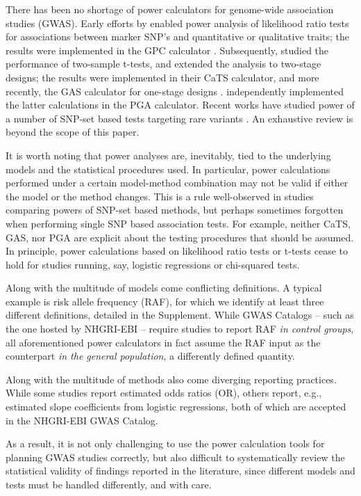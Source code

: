 There has been no shortage of power calculators for genome-wide association studies (GWAS).
Early efforts by \cite{Sham98} enabled power analysis of likelihood ratio tests for associations between marker SNP's and quantitative or qualitative traits; the results were implemented in the GPC calculator \citep{Purcell03}.
Subsequently, \cite{Skol06} studied the performance of two-sample t-tests, and extended the analysis to two-stage designs; the results were implemented in their CaTS calculator, and more recently, the GAS calculator for one-stage designs \citep{Johnson17}.
\citealp{Menashe08} independently implemented the latter calculations in the PGA calculator.
Recent works have studied power of a number of SNP-set based tests targeting rare variants \citep{Wang14, Derkach17}.
An exhaustive review is beyond the scope of this paper.

It is worth noting that power analyses are, inevitably, tied to the underlying models and the statistical procedures used.
In particular, power calculations performed under a certain model-method combination may not be valid if either the model or the method changes.
This is a rule well-observed in studies comparing powers of SNP-set based methods, but perhaps sometimes forgotten when performing single SNP based association tests.
For example, neither CaTS, GAS, nor PGA are explicit about the testing procedures that should be assumed.
In principle, power calculations based on likelihood ratio tests or t-tests cease to hold for studies running, say, logistic regressions or chi-squared tests.

Along with the multitude of models come conflicting definitions. 
A typical example is risk allele frequency (RAF), for which we identify at least three different definitions, detailed in the Supplement. 
While GWAS Catalogs -- such as the one hosted by NHGRI-EBI \citep{MacArthur16} -- require studies to report RAF \emph{in control groups}, all aforementioned power calculators in fact assume the RAF input as the counterpart \emph{in the general population}, a differently defined quantity.

Along with the multitude of methods also come diverging reporting practices.
While some studies report estimated odds ratios (OR), others report, e.g., estimated slope coefficients from logistic regressions, both of which are accepted in the NHGRI-EBI GWAS Catalog.

As a result, it is not only challenging to use the power calculation tools for planning GWAS studies correctly, 
but also difficult to systematically review the statistical validity of findings reported in the literature, since different models and tests must be handled differently, and with care.

